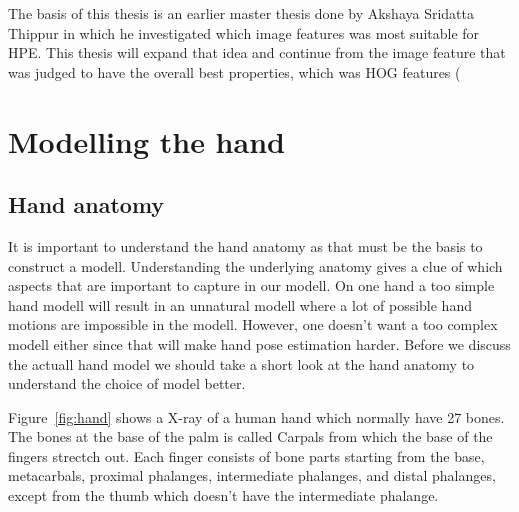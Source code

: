 \documentclass[a4paper,11pt]{kth-mag}
\begin{document}
The basis of this thesis is an earlier master thesis done by Akshaya Sridatta Thippur %
in which he investigated which image features was most suitable for HPE.
This thesis will expand that idea and continue from the image feature that was judged to have the overall best properties, which was HOG features (%
 

\section{Modelling the hand}
\subsection{Hand anatomy}
It is important to understand the hand anatomy as that must be the basis to construct a modell.
Understanding the underlying anatomy gives a clue of which aspects that are important to capture in our modell.
On one hand a too simple hand modell will result in an unnatural modell where a lot of possible hand motions are impossible in the modell.
However, one doesn't want a too complex modell either since that will make hand pose estimation harder.
Before we discuss the actuall hand model we should take a short look at the hand anatomy to understand the choice of model better.

Figure~\ref{fig:hand} shows a X-ray of a human hand which normally have 27 bones. 
The bones at the base of the palm is called Carpals from which the base of the fingers strectch out.
Each finger consists of bone parts starting from the base, metacarbals, proximal phalanges, intermediate phalanges, and distal phalanges, except from the thumb which doesn't have the intermediate phalange.
\end{document}
